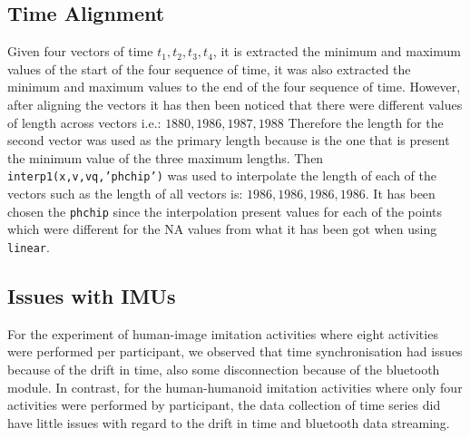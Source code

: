 \subsection{Time Alignment}
Given four vectors of time
$t_1, t_2, t_3, t_4$, it is extracted the minimum and maximum values
of the start of the four sequence of time,
it was also extracted the minimum and maximum values to the
end of the four sequence of time.
However, after aligning the vectors it has then  been noticed that there were
different values of length across vectors i.e.: $1880,1986,1987,1988$
Therefore the length for the second vector was used as the primary length
because is the one that is present the minimum value of the three maximum
lengths. Then \texttt{interp1(x,v,vq,'phchip')}  was used to interpolate the
length of each of the vectors such as the length of all vectors is: 
$1986,1986,1986,1986$.
It has been chosen the \texttt{phchip} since the interpolation present
values for each of the points which were different for the NA values
from what it has been got when using \texttt{linear}.

\subsection{Issues with IMUs} \label{appendix:imus:issues}
For the experiment of human-image imitation activities where eight activities 
were performed per participant, we observed that time synchronisation had 
issues because of the drift in time, also some disconnection because of the 
bluetooth module. In contrast, for the human-humanoid imitation activities
where only four activities were performed by participant, the data collection
of time series did have little issues with regard to the drift in time 
and bluetooth data streaming.  

\newpage
